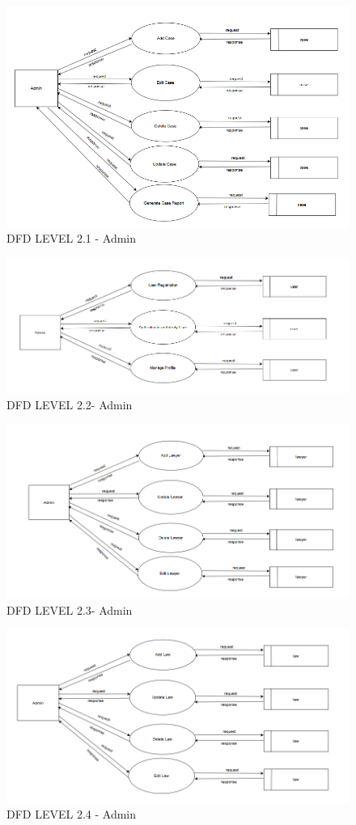 \begin{figure}
  \centering
  \includegraphics[width=0.8\linewidth]{Admin2.1case.png}
 \caption{DFD LEVEL 2.1 - Admin}
   \label{fig:DFD LEVEL 2.1 - Admin}
\end{figure}

\begin{figure}
  \centering
  \includegraphics[width=0.8\linewidth]{Admin2.2user.png}
 \caption{DFD LEVEL 2.2- Admin}
   \label{fig:DFD LEVEL 2.2 - Admin}
\end{figure}

\begin{figure}
  \centering
  \includegraphics[width=0.8\linewidth]{Admin2.3lawyer.png}
 \caption{DFD LEVEL 2.3- Admin}
   \label{fig:DFD LEVEL 2.3 - Admin}
\end{figure}

\begin{figure}
  \centering
  \includegraphics[width=0.8\linewidth]{Admin2.4law.png}
 \caption{DFD LEVEL 2.4 - Admin}
   \label{fig:DFD LEVEL 2.4 - Admin}
\end{figure}
%
